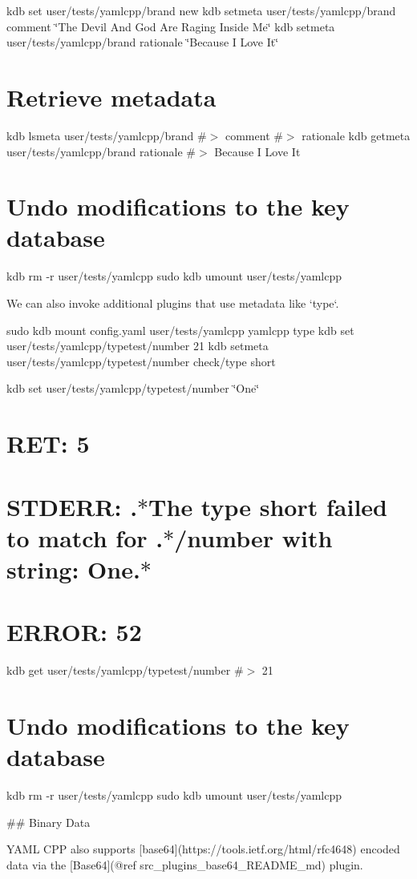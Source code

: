 kdb set user/tests/yamlcpp/brand new kdb setmeta user/tests/yamlcpp/brand comment \char`\"{}\+The Devil And God Are Raging Inside Me\char`\"{} kdb setmeta user/tests/yamlcpp/brand rationale \char`\"{}\+Because I Love It\char`\"{}

\section*{Retrieve metadata}

kdb lsmeta user/tests/yamlcpp/brand \#$>$ comment \#$>$ rationale kdb getmeta user/tests/yamlcpp/brand rationale \#$>$ Because I Love It

\section*{Undo modifications to the key database}

kdb rm -\/r user/tests/yamlcpp sudo kdb umount user/tests/yamlcpp 
\begin{DoxyCode}
We can also invoke additional plugins that use metadata like `type`.
\end{DoxyCode}
 sudo kdb mount config.\+yaml user/tests/yamlcpp yamlcpp type kdb set user/tests/yamlcpp/typetest/number 21 kdb setmeta user/tests/yamlcpp/typetest/number check/type short

kdb set user/tests/yamlcpp/typetest/number \char`\"{}\+One\char`\"{} \section*{R\+ET\+: 5}

\section*{S\+T\+D\+E\+RR\+: .$\ast$\+The type short failed to match for .$\ast$/number with string\+: One.$\ast$}

\section*{E\+R\+R\+OR\+: 52}

kdb get user/tests/yamlcpp/typetest/number \#$>$ 21

\section*{Undo modifications to the key database}

kdb rm -\/r user/tests/yamlcpp sudo kdb umount user/tests/yamlcpp 
\begin{DoxyCode}
## Binary Data

YAML CPP also supports [base64](https://tools.ietf.org/html/rfc4648) encoded data via the [Base64](@ref
       src\_plugins\_base64\_README\_md) plugin.
\end{DoxyCode}
